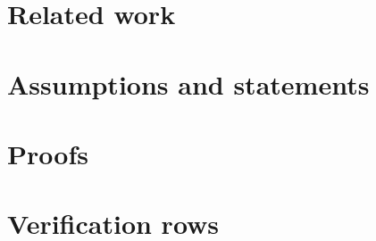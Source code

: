 \documentclass{article}
\begin{document}



\clearpage
\appendix

\section{Related work}
\label{app:related}


\clearpage
\section{Assumptions and statements}
\label{app:statements}


\section{Proofs}
\label{app:proofs}


\clearpage
\section{Verification rows}
\label{app:table}
\end{document}
